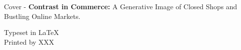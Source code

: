 \subject \\	
\dept \\
\university \\
\address \\
\setlength{\parskip}{0.5cm}

\vfill
Cover - \textbf{Contrast in Commerce:} A Generative Image of Closed Shops and Bustling Online Markets. \setlength{\parskip}{0.5cm}

Typeset in \LaTeX \tagtemp\\
Printed by XXX \\
\address \ \the\year
